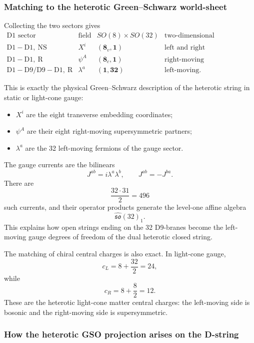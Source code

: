 \documentclass[
  10pt,
  a4paper,
  openany]{book}
\providecommand{\tightlist}{%
  \setlength{\itemsep}{0pt}\setlength{\parskip}{0pt}}
\begin{document}
\subsubsection{Matching to the heterotic Green--Schwarz
world-sheet}\label{matching-to-the-heterotic-greenschwarz-world-sheet}

Collecting the two sectors gives \[
\begin{array}{c|c|c|c}
\text{D1 sector}
&\text{field}
&SO(8)\times SO(32)
&\text{two-dimensional propagation}\\ \hline
\mathrm{D1-D1,\ NS}
&X^i
&(\mathbf8_v,\mathbf1)
&\text{left and right}\\
\mathrm{D1-D1,\ R}
&\psi^A
&(\mathbf8_c,\mathbf1)
&\text{right-moving}\\
\mathrm{D1-D9/D9-D1,\ R}
&\lambda^a
&(\mathbf1,\mathbf{32})
&\text{left-moving}.
\end{array}
\]

This is exactly the physical Green--Schwarz description of the heterotic
string in static or light-cone gauge:

\begin{itemize}
\tightlist
\item
  \(X^i\) are the eight transverse embedding coordinates;
\item
  \(\psi^A\) are their eight right-moving supersymmetric partners;
\item
  \(\lambda^a\) are the 32 left-moving fermions of the gauge sector.
\end{itemize}

The gauge currents are the bilinears \[
\boxed{
J^{ab}
=i\lambda^a\lambda^b,
\qquad
J^{ab}=-J^{ba}
}.
\] There are \[
\frac{32\cdot31}{2}=496
\] such currents, and their operator products generate the level-one
affine algebra \[
\widehat{\mathfrak{so}}(32)_1.
\] This explains how open strings ending on the 32 D9-branes become the
left-moving gauge degrees of freedom of the dual heterotic closed
string.

The matching of chiral central charges is also exact. In light-cone
gauge, \[
c_L
=8+\frac{32}{2}
=24,
\] while \[
c_R
=8+\frac{8}{2}
=12.
\] These are the heterotic light-cone matter central charges: the
left-moving side is bosonic and the right-moving side is supersymmetric.

\subsubsection{How the heterotic GSO projection arises on the
D-string}\label{how-the-heterotic-gso-projection-arises-on-the-d-string}
\end{document}
